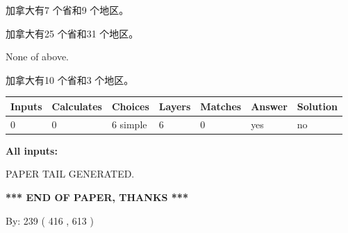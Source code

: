 \documentclass{ctexart}
\begin{document}
 
加拿大有7 个省和9 个地区。
 
 
加拿大有25 个省和31 个地区。
 
 
 None of above.
 
 
\noindent{}
 
 
加拿大有10 个省和3 个地区。
 
 
\noindent{}
 
 
   
   
   
   
\noindent\begin{tabular}{|l|l|l|l|l|l|l|}
 \hline
Inputs & Calculates & Choices & Layers & Matches & Answer & Solution \\ \hline
 0  & 
 0  & 
 6
  simple  
  & 
 6  & 
 0  & 
  yes & 
  no 
  \\ \hline
 \end{tabular}
   
   
   
   
\noindent{}
   
   
   
   
\noindent\vspace{0.1in}\hspace{-0.08in} {\textbf{\Large{All inputs: }}}
   
   
   
   
   
   
 \vspace{0.2in}
 
   
   
\vspace{2.0in} PAPER TAIL GENERATED.
   
   
   
   
\vspace{1.0in} 
{\textbf{\large{ *** END OF PAPER, THANKS *** }}} 
   
   
\hspace{1.0in} By: 
 239 ( 416 ,  613 )
   
   
   
   
\newpage 
\setcounter{page}{ 
   500001 } 
   
   
   
\end{document}
